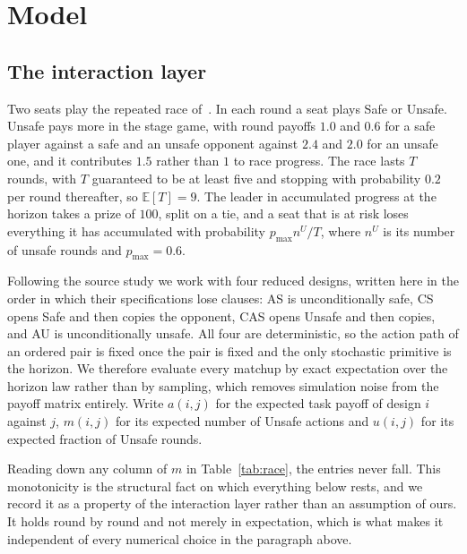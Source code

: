 \documentclass[11pt,a4paper]{article}
\theoremstyle{definition}
\newcommand{\AS}{\textsf{AS}}
\newcommand{\CS}{\textsf{CS}}
\newcommand{\CAS}{\textsf{CAS}}
\newcommand{\AU}{\textsf{AU}}
\begin{document}
\section{Model}
\label{sec:model}

\subsection{The interaction layer}

Two seats play the repeated race of~\citet{domingos2026falling}. In each round
a seat plays Safe or Unsafe. Unsafe pays more in the stage game, with round
payoffs $1.0$ and $0.6$ for a safe player against a safe and an unsafe
opponent against $2.4$ and $2.0$ for an unsafe one, and it contributes $1.5$
rather than $1$ to race progress. The race lasts $T$ rounds, with $T$
guaranteed to be at least five and stopping with probability $0.2$ per round
thereafter, so $\mathbb{E}[T]=9$. The leader in accumulated progress at the
horizon takes a prize of $100$, split on a tie, and a seat that is at risk
loses everything it has accumulated with probability $p_{\max} n^{U}/T$, where
$n^{U}$ is its number of unsafe rounds and $p_{\max}=0.6$.

Following the source study we work with four reduced designs, written here in
the order in which their specifications lose clauses:
\AS{} is unconditionally safe, \CS{} opens Safe and then copies the opponent,
\CAS{} opens Unsafe and then copies, and \AU{} is unconditionally unsafe. All
four are deterministic, so the action path of an ordered pair is fixed once
the pair is fixed and the only stochastic primitive is the horizon. We
therefore evaluate every matchup by exact expectation over the horizon law
rather than by sampling, which removes simulation noise from the payoff matrix
entirely. Write $a(i,j)$ for the expected task payoff of design $i$ against
$j$, $m(i,j)$ for its expected number of Unsafe actions and $u(i,j)$ for its
expected fraction of Unsafe rounds.



Reading down any column of $m$ in Table~\ref{tab:race}, the entries never fall.
This monotonicity is the structural fact on which everything below rests, and we
record it as a property of the interaction layer rather than an assumption of
ours. It holds round by round and not merely in expectation, which is what
makes it independent of every numerical choice in the paragraph above.

\FloatBarrier
\end{document}

